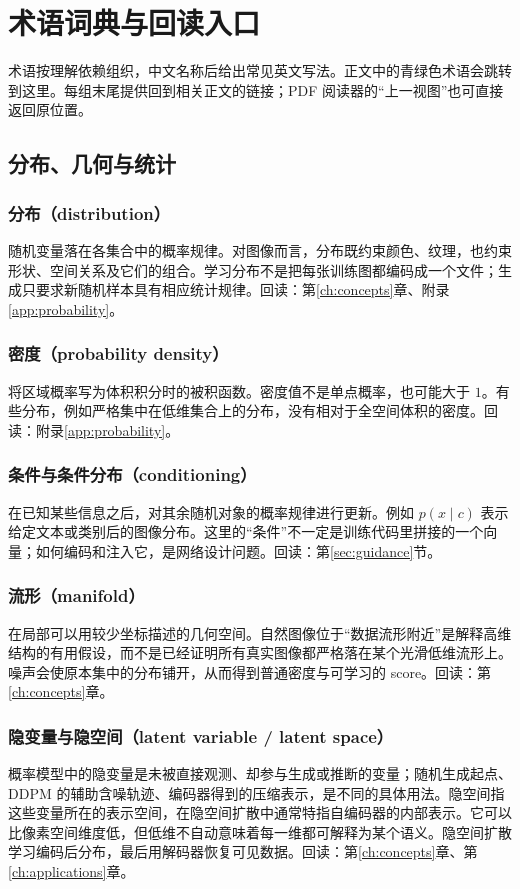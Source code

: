 \chapter{术语词典与回读入口}\label{app:glossary}
术语按理解依赖组织，中文名称后给出常见英文写法。正文中的青绿色术语会跳转到这里。每组末尾提供回到相关正文的链接；PDF 阅读器的“上一视图”也可直接返回原位置。

\section{分布、几何与统计}
\subsection*{分布（distribution）}\label{gl:distribution}
随机变量落在各集合中的概率规律。对图像而言，分布既约束颜色、纹理，也约束形状、空间关系及它们的组合。学习分布不是把每张训练图都编码成一个文件；生成只要求新随机样本具有相应统计规律。回读：第\ref{ch:concepts}章、附录\ref{app:probability}。

\subsection*{密度（probability density）}\label{gl:density}
将区域概率写为体积积分时的被积函数。密度值不是单点概率，也可能大于 $1$。有些分布，例如严格集中在低维集合上的分布，没有相对于全空间体积的密度。回读：附录\ref{app:probability}。

\subsection*{条件与条件分布（conditioning）}\label{gl:conditional}
在已知某些信息之后，对其余随机对象的概率规律进行更新。例如 $p(x\mid c)$ 表示给定文本或类别后的图像分布。这里的“条件”不一定是训练代码里拼接的一个向量；如何编码和注入它，是网络设计问题。回读：第\ref{sec:guidance}节。

\subsection*{流形（manifold）}\label{gl:manifold}
在局部可以用较少坐标描述的几何空间。自然图像位于“数据流形附近”是解释高维结构的有用假设，而不是已经证明所有真实图像都严格落在某个光滑低维流形上。噪声会使原本集中的分布铺开，从而得到普通密度与可学习的 score。回读：第\ref{ch:concepts}章。

\subsection*{隐变量与隐空间（latent variable / latent space）}\label{gl:latent}
概率模型中的隐变量是未被直接观测、却参与生成或推断的变量；随机生成起点、DDPM 的辅助含噪轨迹、编码器得到的压缩表示，是不同的具体用法。隐空间指这些变量所在的表示空间，在隐空间扩散中通常特指自编码器的内部表示。它可以比像素空间维度低，但低维不自动意味着每一维都可解释为某个语义。隐空间扩散学习编码后分布，最后用解码器恢复可见数据。回读：第\ref{ch:concepts}章、第\ref{ch:applications}章。

